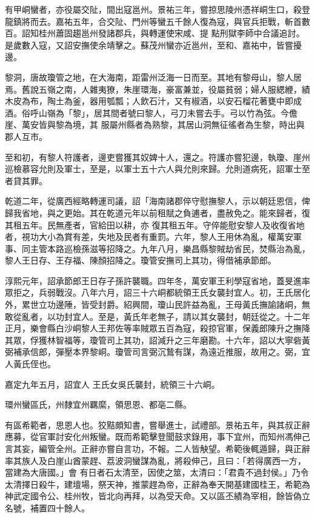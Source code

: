 \begin{pinyinscope}
 有甲峒蠻者，亦役屬交阯，間出寇邕州。景祐三年，嘗掠思陵州憑祥峒生口，殺登龍鎮將而去。嘉祐五年，合交阯、門州等蠻五千餘人復為寇，與官兵拒戰，斬首數百。詔知桂州蕭固趨邕州發諸郡兵，與轉運使宋咸、提
 點刑獄李師中合議追討。是歲數入寇，又詔安撫使余靖擊之。蘇茂州蠻亦近邕州，至和、嘉祐中，皆嘗擾邊。



 黎洞，唐故瓊管之地，在大海南，距雷州泛海一日而至。其地有黎母山，黎人居焉。舊說五嶺之南，人雜夷獠，朱崖環海，豪富兼並，役屬貧弱；婦人服緦緶，績木皮為布，陶土為釜，器用瓠瓢；人飲石汁，又有椒酒，以安石榴花著甕中即成酒。俗呼山嶺為「黎」，居其間者號曰黎人，弓刀未嘗去手。弓以竹為弦。今儋崖、萬安皆與黎為境，其
 服屬州縣者為熟黎，其居山洞無征徭者為生黎，時出與郡人互市。



 至和初，有黎人符護者，邊吏嘗獲其奴婢十人，還之。符護亦嘗犯邊，執瓊、崖州巡檢慕容允則及軍士，至是，以軍士五十六人與允則來歸。允則道病死，詔軍士至者貸其罪。



 乾道二年，從廣西經略轉運司議，詔「海南諸郡倅守慰撫黎人，示以朝廷恩信，俾歸我省地，與之更始。其在乾道元年以前租賦之負逋者，盡赦免之。能來歸者，復其租五年。民無產者，官給田以耕，亦
 復其租五年。守倅能慰安黎人及收復省地者，視功大小為賞有差，失地及民者有重罰。六年，黎人王用休為亂，權萬安軍事、同主管本路巡檢孫滋等招降之。九年八月，樂昌縣黎賊劫省民，焚縣治為亂，黎人王日存、王存福、陳顏招降之。瓊管安撫司上其功，得借補承節郎。



 淳熙元年，詔承節郎王日存子孫許襲職。四年冬，萬安軍王利學寇省地，蓋旻進率眾拒之，兵弱戰沒。八年六月，詔三十六峒都統領王氏女襲封宜人。初，王氏居化
 外，累世立功邊陲，皆受封爵。紹興間，瓊山民許益為亂，王母黃氏撫諭諸峒，無敢從亂者，以功封宜人。至是，黃氏年老無子，請以其女襲封，朝廷從之。十二年正月，樂會縣白沙峒黎人王邦佐等率賊眾五百為寇，殺掠官軍，保義郎陳升之撫降其眾，俘獲林智福等，瓊管司上其功，詔減升之三年磨勘。十六年，詔以大寧砦黃弼補承信郎，彈壓本界黎峒。瓊管司言弼沉鷙有謀，為遠近推服，故用之。弼，宜人黃氏侄也。



 嘉定九年五月，詔宜人
 王氏女吳氏襲封，統領三十六峒。



 環州蠻區氏，州隸宜州羈縻，領思恩、都亳二縣。



 有區希範者，思恩人也。狡黠頗知書，嘗舉進士，試禮部。景祐五年，與其叔正辭應募，從官軍討安化州叛蠻。既而希範擊登聞鼓求錄用，事下宜州，而知州馮伸己言其妄，編管全州。正辭亦嘗自言功，不報。二人皆觖望。希範後輒遁歸，與正辭率其族人及白崖山酋蒙趕、荔波洞蠻謀為亂，將殺伸己，且曰：「若得廣西一方，當建為大唐國。」會
 有日者石太清至，因使之筮，太清曰：「君貴不過封侯。」乃令太清擇日殺牛，建壇場，祭天神，推蒙趕為帝，正辭為奉天開基建國桂王，希範為神武定國令公、桂州牧，皆北向再拜，以為受天命。又以區丕績為宰相，餘皆偽立名號，補置四十餘人。




\end{pinyinscope}
